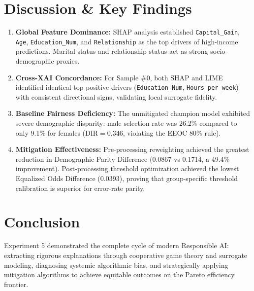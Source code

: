 \documentclass[11pt, a4paper]{article}
\begin{document}
\section{Discussion \& Key Findings}
\begin{enumerate}[leftmargin=1.5em]
    \item \textbf{Global Feature Dominance:} SHAP analysis established \texttt{Capital\_Gain}, \texttt{Age}, \texttt{Education\_Num}, and \texttt{Relationship} as the top drivers of high-income predictions. Marital status and relationship status act as strong socio-demographic proxies.
    \item \textbf{Cross-XAI Concordance:} For Sample \#0, both SHAP and LIME identified identical top positive drivers (\texttt{Education\_Num}, \texttt{Hours\_per\_week}) with consistent directional signs, validating local surrogate fidelity.
    \item \textbf{Baseline Fairness Deficiency:} The unmitigated champion model exhibited severe demographic disparity: male selection rate was 26.2\% compared to only 9.1\% for females ($\text{DIR} = 0.346$, violating the EEOC 80\% rule).
    \item \textbf{Mitigation Effectiveness:} Pre-processing reweighting achieved the greatest reduction in Demographic Parity Difference (0.0867 vs 0.1714, a 49.4\% improvement). Post-processing threshold optimization achieved the lowest Equalized Odds Difference (0.0393), proving that group-specific threshold calibration is superior for error-rate parity.
\end{enumerate}

\section{Conclusion}
Experiment 5 demonstrated the complete cycle of modern Responsible AI: extracting rigorous explanations through cooperative game theory and surrogate modeling, diagnosing systemic algorithmic bias, and strategically applying mitigation algorithms to achieve equitable outcomes on the Pareto efficiency frontier.
\end{document}
